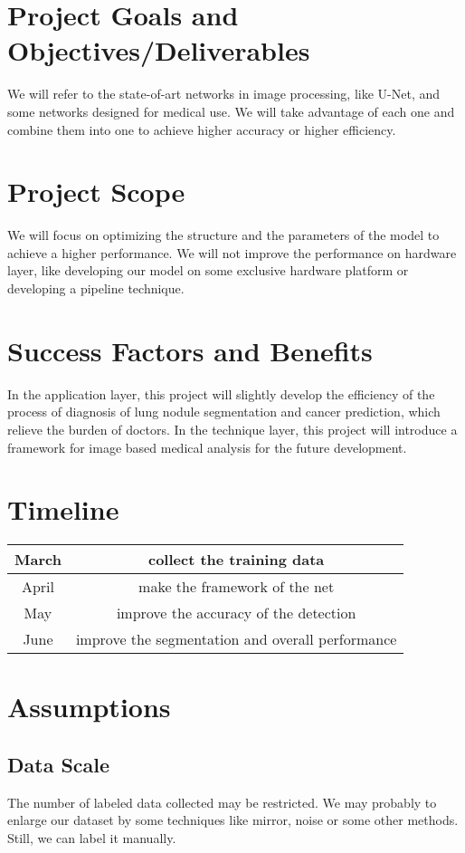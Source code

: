 \documentclass[hyperref]{article}
\theoremstyle{nonumberplain}
\begin{document}
\section{Project Goals and Objectives/Deliverables}
We will refer to the state-of-art networks in image processing, like U-Net, and some networks designed for medical use. We will take advantage of each one and combine them into one to achieve higher accuracy or higher efficiency.

\section{Project Scope}
We will focus on optimizing the structure and the parameters of the model to achieve a higher performance. We will not improve the performance on hardware layer, like developing our model on some exclusive hardware platform or developing a pipeline technique.

\section{Success Factors and Benefits}
In the application layer, this project will slightly develop the efficiency of the process of diagnosis of lung nodule segmentation and cancer prediction, which relieve the burden of doctors. In the technique layer, this project will introduce a framework for image based medical analysis for the future development.

\section{Timeline}
\begin{tabular}{c|c}
March & collect the training data\\
\hline
April & make the framework of the net\\
\hline
May   & improve the accuracy of the detection\\
\hline
June  & improve the segmentation and overall performance\\
\end{tabular}

\section{Assumptions}
\subsection{Data Scale}
The number of labeled data collected may be restricted. We may probably to enlarge our dataset by some techniques like mirror, noise or some other methods. Still, we can label it manually.
\end{document}
